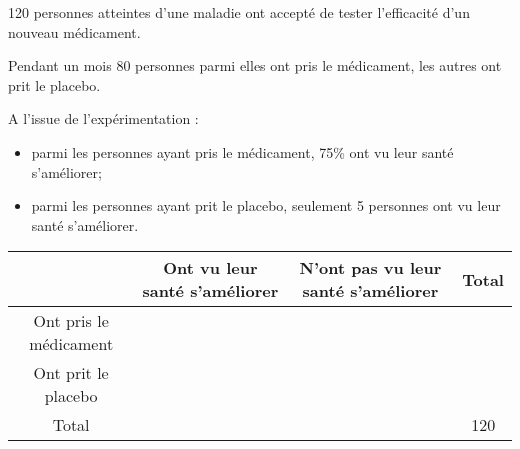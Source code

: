 \documentclass[a4paper,11pt]{exam}
\begin{document}
120 personnes atteintes d'une maladie ont accepté de tester l'efficacité d'un nouveau médicament. 

Pendant un mois 80 personnes parmi elles ont pris le médicament, les autres ont prit le placebo.

A l'issue de l'expérimentation :
\begin{itemize}
	\item parmi les personnes ayant pris le médicament, 75\% ont vu leur santé s'améliorer;
	\item parmi les personnes ayant prit le placebo, seulement 5 personnes ont vu leur santé s'améliorer.
\end{itemize} 
\begin{center}
	
	{\small \begin{tabular}{|@{\ }c@{\ }|@{\ }c@{\ }|@{\ }c@{\ }|@{\ }c@{\ }|}
			\hline
			& Ont vu leur santé s'améliorer & N'ont pas vu leur santé s'améliorer &  Total  \\
			\hline
			Ont pris le médicament &  &  &    \\
			\hline
			Ont prit le placebo &  &  &   \\
			\hline
			Total &  &  & 120   \\
			\hline
	\end{tabular}}
\end{center}
\end{document}
